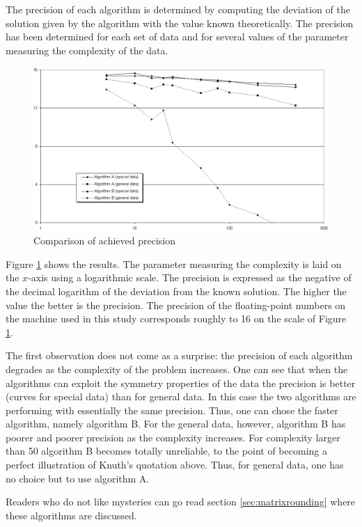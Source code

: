 The precision of each algorithm is determined by computing the
deviation of the solution given by the algorithm with the value
known theoretically. The precision has been determined for each
set of data and for several values of the parameter measuring the
complexity of the data.

\begin{figure}
\centering\includegraphics[width=12cm]{Figures/Precision}
\caption{Comparison of achieved precision} \label{fig:precision}
\end{figure}
Figure \ref{fig:precision} shows the results. The parameter
measuring the complexity is laid on the $x$-axis using a
logarithmic scale. The precision is expressed as the negative of
the decimal logarithm of the deviation from the known solution.
The higher the value the better is the precision. The precision of
the floating-point numbers on the machine used in this study
corresponds roughly to 16 on the scale of Figure
\ref{fig:precision}.

The first observation does not come as a surprise: the precision
of each algorithm degrades as the complexity of the problem
increases. One can see that when the algorithms can exploit the
symmetry properties of the data the precision is better (curves
for special data) than for general data. In this case the two
algorithms are performing with essentially the same precision.
Thus, one can chose the faster algorithm, namely algorithm B. For
the general data, however, algorithm B has poorer and poorer
precision as the complexity increases. For complexity larger than
50 algorithm B becomes totally unreliable, to the point of
becoming a perfect illustration of Knuth's quotation above. Thus,
for general data, one has no choice but to use algorithm A.

Readers who do not like mysteries can go read section
\ref{sec:matrixrounding} where these algorithms are discussed.

